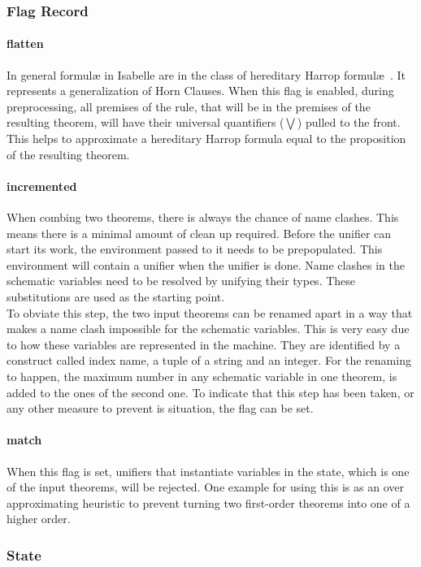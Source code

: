 \subsubsection{Flag Record}
\paragraph{flatten}
In general formul\ae {} in Isabelle are in the class of hereditary Harrop formul\ae~\parencite{implementation}. It represents a generalization of Horn Clauses. When this flag is enabled, during preprocessing, all premises of the rule, that will be in the premises of the resulting theorem, will have their universal quantifiers ($\bigvee$) pulled to the front. This helps to approximate a hereditary Harrop formula equal to the proposition of the resulting theorem.
\paragraph{incremented}
When combing two theorems, there is always the chance of name clashes. This means there is a minimal amount of clean up required. Before the unifier can start its work, the environment passed to it needs to be prepopulated. This environment will contain a unifier when the unifier is done. Name clashes in the schematic variables need to be resolved by unifying their types. These substitutions are used as the starting point.\\
To obviate this step, the two input theorems can be renamed apart in a way that makes a name clash impossible for the schematic variables. This is very easy due to how these variables are represented in the machine. They are identified by a construct called index name, a tuple of a string and an integer. For the renaming to happen, the maximum number in any schematic variable in one theorem, is added to the ones of the second one. To indicate that this step has been taken, or any other measure to prevent is situation, the flag can be set.
\paragraph{match}
When this flag is set, unifiers that instantiate variables in the state, which is one of the input theorems, will be rejected. One example for using this is as an over approximating heuristic to prevent turning two first-order theorems into one of a higher order.

\subsubsection{State}
